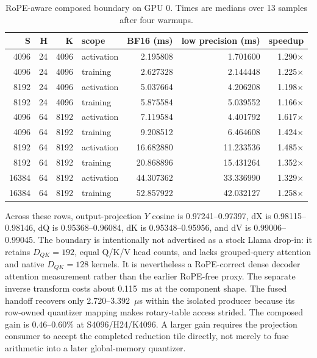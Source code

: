 \begin{table}[htbp]
\centering
\caption{RoPE-aware composed boundary on GPU 0.  Times are medians over 13
samples after four warmups.}
\label{tab:rope-e2e}
\scriptsize
\begin{tabular}{rrr l rrr}
\toprule
S & H & K & scope & BF16 (ms) & low precision (ms) & speedup \\
\midrule
4096  & 24 & 4096 & activation & 2.195808 & 1.701600 & 1.290$\times$ \\
4096  & 24 & 4096 & training   & 2.627328 & 2.144448 & 1.225$\times$ \\
8192  & 24 & 4096 & activation & 5.037664 & 4.206208 & 1.198$\times$ \\
8192  & 24 & 4096 & training   & 5.875584 & 5.039552 & 1.166$\times$ \\
4096  & 64 & 8192 & activation & 7.119584 & 4.401792 & 1.617$\times$ \\
4096  & 64 & 8192 & training   & 9.208512 & 6.464608 & 1.424$\times$ \\
8192  & 64 & 8192 & activation & 16.682880 & 11.233536 & 1.485$\times$ \\
8192  & 64 & 8192 & training   & 20.868896 & 15.431264 & 1.352$\times$ \\
16384 & 64 & 8192 & activation & 44.307362 & 33.336990 & 1.329$\times$ \\
16384 & 64 & 8192 & training   & 52.857922 & 42.032127 & 1.258$\times$ \\
\bottomrule
\end{tabular}
\end{table}

Across these rows, output-projection $Y$ cosine is 0.97241--0.97397, dX is
0.98115--0.98146, dQ is 0.95368--0.96084, dK is 0.95348--0.95956, and dV is
0.99006--0.99045.  The boundary is intentionally not advertised as a stock
Llama drop-in: it retains $D_{QK}=192$, equal Q/K/V head counts, and lacks
grouped-query attention and native $D_{QK}=128$ kernels.  It is nevertheless
a RoPE-correct dense decoder attention measurement rather than the earlier
RoPE-free proxy.  The separate inverse transform costs about 0.115~ms at the
component shape.  The fused handoff recovers only 2.720--3.392~$\mu$s within
the isolated producer because its row-owned quantizer mapping makes
rotary-table access strided.  The composed gain is 0.46--0.60\% at
S4096/H24/K4096.  A larger gain requires the projection consumer to accept
the completed reduction tile directly, not merely to fuse arithmetic into a
later global-memory quantizer.

